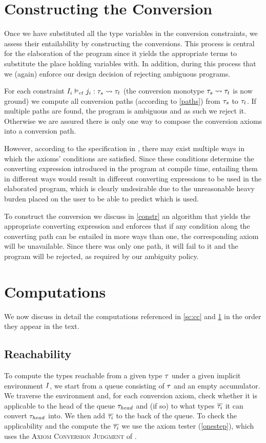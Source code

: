 \section{Constructing the Conversion}
\label{constructing}
Once we have substituted all the type variables in the conversion constraints, we assess their entailability by constructing the conversions. This process is central for the elaboration of the program since it yields the appropriate terms to substitute the place holding variables with. In addition, during this process that we (again) enforce our design decision of rejecting ambiguous programs.

For each constraint ${I_i} \vDash_{ct} {j_i}: {\mathit{\tau}_{s}} \rightsquigarrow {\mathit{\tau}_{t}}$ (the conversion monotype $\mathit{\tau}_{s}\rightsquigarrow \mathit{\tau}_{t}$ is now ground) we compute all conversion paths (according to \ref{paths}) from $\mathit{\tau}_{s}$ to $\mathit{\tau}_{t}$. If multiple paths are found, the program is ambiguous and as such we reject it. Otherwise we are assured there is only one way to compose the conversion axioms into a conversion path.

However, according to the specification in , there may exist multiple ways in which the axioms' conditions are satisfied. Since these conditions determine the converting expression introduced in the program at compile time, entailing them in different ways would result in different converting expressions to be used in the elaborated program, which is clearly undesirable due to the unreasonable heavy burden placed on the user to be able to predict which is used.

To construct the conversion we discuss in \ref{constr} an algorithm that yields the appropriate converting expression and enforces that if any condition along the converting path can be entailed in more ways than one, the corresponding axiom will be unavailable. Since there was only one path, it will fail to it and the program will be rejected, as required by our ambiguity policy.

\section{Computations}
\label{computations}
We now discuss in detail the computations referenced in \ref{sc:cc} and \ref{constructing} in the order they appear in the text.

\subsection{Reachability}
To compute the types reachable from a given type $\mathit{\tau}$ under a given implicit environment $I$, we start from a queue consisting of $\mathit{\tau}$ and an empty accumulator. We traverse the environment and, for each conversion axiom, check whether it is applicable to the head of the queue $\mathit{\tau}_{head}$ and (if so) to what types $\overline{\mathit{\tau}_i}$ it can convert $\mathit{\tau}_{head}$ into. We then add $\overline{\mathit{\tau}_i}$ to the back of the queue. To check the applicability and the compute the $\overline{\mathit{\tau}_i}$ we use the axiom tester (\ref{onestep}), which uses the \textsc{Axiom Conversion Judgment} of .


